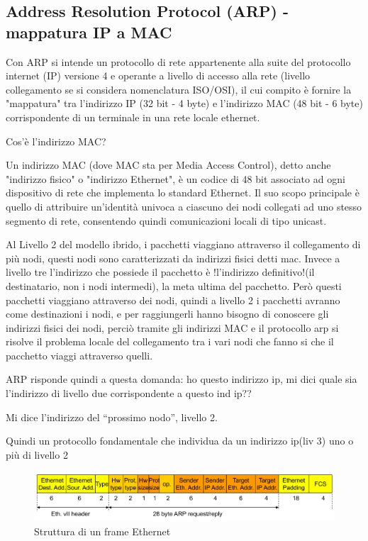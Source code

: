 \newpage
\subsection{Address Resolution Protocol (ARP) - mappatura IP a MAC}
Con ARP si intende un protocollo di rete appartenente alla suite del protocollo internet (IP) versione 4 e operante a livello di accesso alla rete (livello collegamento se si considera nomenclatura ISO/OSI), il cui compito è fornire la "mappatura" tra l'indirizzo IP (32 bit - 4 byte) e l'indirizzo MAC (48 bit - 6 byte) corrispondente di un terminale in una rete locale ethernet.

Cos'è l'indirizzo MAC? 

Un indirizzo MAC (dove MAC sta per Media Access Control), detto anche "indirizzo fisico" o "indirizzo Ethernet", è un codice di 48 bit associato ad ogni dispositivo di rete che implementa lo standard Ethernet. Il suo scopo principale è quello di attribuire un'identità univoca a ciascuno dei nodi collegati ad uno stesso segmento di rete, consentendo quindi comunicazioni locali di tipo unicast. 

Al Livello 2 del modello ibrido, i pacchetti viaggiano attraverso il collegamento di più nodi, questi nodi sono caratterizzati da indirizzi fisici detti mac. 
Invece a livello tre l'indirizzo che possiede il pacchetto è !l'indirizzo definitivo!(il destinatario, non i nodi intermedi), la meta ultima del pacchetto. Però questi pacchetti viaggiano attraverso dei nodi, quindi a livello 2 i pacchetti avranno come destinazioni i nodi, e per raggiungerli hanno bisogno di conoscere gli indirizzi fisici dei nodi, perciò tramite gli indirizzi MAC e il protocollo arp si risolve il problema locale del collegamento tra i vari nodi che fanno si che il pacchetto viaggi attraverso quelli.

ARP risponde quindi a questa domanda: ho questo indirizzo ip, mi dici quale sia l'indirizzo di livello due corrispondente a questo ind ip??

Mi dice l'indirizzo del “prossimo nodo”, livello 2.

Quindi un protocollo fondamentale che individua da un indirizzo ip(liv 3) uno o più di livello 2


\begin{figure}[h!]
    \centering
    \includegraphics[width=1\textwidth]{images/frameethernet.png}
    \caption{Struttura di un frame Ethernet}
    \label{fig:frameethernet}
\end{figure}

